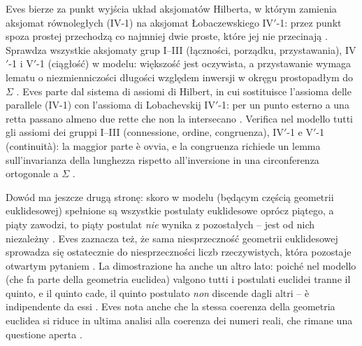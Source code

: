 Eves bierze za punkt wyjścia układ aksjomatów Hilberta, w którym zamienia aksjomat równoległych (IV-1) na aksjomat Łobaczewskiego IV$'$-1: przez punkt spoza prostej przechodzą co najmniej dwie proste, które jej nie przecinają \cite[s. 347]{eves1_1972}. %
Sprawdza wszystkie aksjomaty grup I--III (łączności, porządku, przystawania), IV$'$-1 i V$'$-1 (ciągłość) w modelu: większość jest oczywista, a przystawanie wymaga lematu o niezmienniczości długości względem inwersji w okręgu prostopadłym do $\Sigma$ \cite[s. 348--352]{eves1_1972}. %
Eves parte dal sistema di assiomi di Hilbert, in cui sostituisce l'assioma delle parallele (IV-1) con l'assioma di Lobachevskij IV$'$-1: per un punto esterno a una retta passano almeno due rette che non la intersecano \cite[p. 347]{eves1_1972}. %
Verifica nel modello tutti gli assiomi dei gruppi I--III (connessione, ordine, congruenza), IV$'$-1 e V$'$-1 (continuità): la maggior parte è ovvia, e la congruenza richiede un lemma sull'invarianza della lunghezza rispetto all'inversione in una circonferenza ortogonale a $\Sigma$ \cite[p. 348--352]{eves1_1972}. %

Dowód ma jeszcze drugą stronę: skoro w modelu (będącym częścią geometrii euklidesowej) spełnione są wszystkie postulaty euklidesowe oprócz piątego, a piąty zawodzi, to piąty postulat \emph{nie} wynika z pozostałych -- jest od nich niezależny \cite[s. 352]{eves1_1972}. %
Eves zaznacza też, że sama niesprzeczność geometrii euklidesowej sprowadza się ostatecznie do niesprzeczności liczb rzeczywistych, która pozostaje otwartym pytaniem \cite[s. 352--353]{eves1_1972}. %
La dimostrazione ha anche un altro lato: poiché nel modello (che fa parte della geometria euclidea) valgono tutti i postulati euclidei tranne il quinto, e il quinto cade, il quinto postulato \emph{non} discende dagli altri -- è indipendente da essi \cite[p. 352]{eves1_1972}. %
Eves nota anche che la stessa coerenza della geometria euclidea si riduce in ultima analisi alla coerenza dei numeri reali, che rimane una questione aperta \cite[p. 352--353]{eves1_1972}. %

